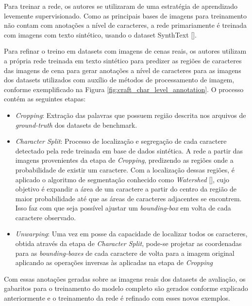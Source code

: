 Para treinar a rede, os autores se utilizaram de uma estratégia de aprendizado levemente supervisionado. Como as principais bases de imagens para treinamento não contam com anotações a nível de caracteres, a rede primariamente é treinada com imagens com texto sintético, usando o dataset SynthText [].

Para refinar o treino em datasets com imagens de cenas reais, os autores utilizam a própria rede treinada em texto sintético para predizer as regiões de caracteres das imagens de cena para gerar anotações a nível de caracteres para as imagens dos datasets utilizados com auxílio de métodos de processamento de imagem, conforme exemplificado na Figura \ref{fig:craft_char_level_annotation}. O processo contém as seguintes etapas:

\begin{itemize}
    \item \textit{Cropping}: Extração das palavras que possuem região descrita nos arquivos de \textit{ground-truth} dos datasets de benchmark.
    \item \textit{Character Split}: Processo de localização e segregação de cada caractere detectado pela rede treinada em base de dados sintética. A rede a partir das imagens provenientes da etapa de \textit{Cropping}, predizendo as regiões onde a probabilidade de existir um caractere. Com a localização dessas regiões, é aplicado o algoritmo de segmentação conhecido como \textit{Watershed} [], cujo objetivo é expandir a área de um caractere a partir do centro da região de maior probabilidade até que as áreas de caracteres adjacentes se encontrem. Isso faz com que seja possível ajustar um \textit{bounding-box} em volta de cada caractere observado.
    \item \textit{Unwarping}: Uma vez em posse da capacidade de localizar todos os caracteres, obtida através da etapa de \textit{Character Split}, pode-se projetar as coordenadas para as \textit{bounding-boxes} de cada caractere de volta para a imagem original aplicando as operações inversas às aplicadas na etapa de \textit{Cropping}
\end{itemize}

Com essas anotações geradas sobre as imagens reais dos datasets de avaliação, os gabaritos para o treinamento do modelo completo são gerados conforme explicado anteriormente e o treinamento da rede é refinado com esses novos exemplos.

